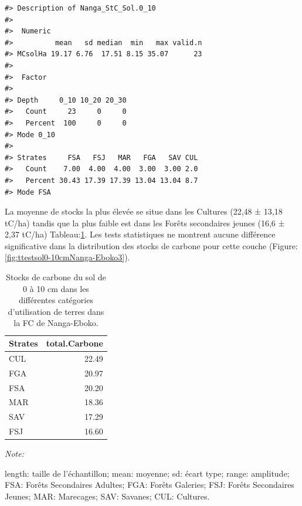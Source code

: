 \documentclass[
  12pt,
  a4paper,
  extrafontsizes,
  onecolumn,
  openright]{book}
\theoremstyle{definition}
\theoremstyle{definition}
\theoremstyle{definition}
\theoremstyle{definition}
\theoremstyle{remark}
\begin{document}
\begin{verbatim}
#> Description of Nanga_StC_Sol.0_10
#> 
#>  Numeric 
#>          mean   sd median  min   max valid.n
#> MCsolHa 19.17 6.76  17.51 8.15 35.07      23
#> 
#>  Factor 
#>          
#> Depth     0_10 10_20 20_30
#>   Count     23     0     0
#>   Percent  100     0     0
#> Mode 0_10 
#>          
#> Strates     FSA   FSJ   MAR   FGA   SAV CUL
#>   Count    7.00  4.00  4.00  3.00  3.00 2.0
#>   Percent 30.43 17.39 17.39 13.04 13.04 8.7
#> Mode FSA
\end{verbatim}

La moyenne de stocks la plus élevée se situe dans les Cultures (22,48 ± 13,18 tC/ha) tandis que la plus faible est dans les Forêts secondaires jeunes (16,6 ± 2,37 tC/ha) Tableau:\ref{tab:Stockscarbonesolde0-10cmNanga-Eboko3}. Les tests statistiques ne montrent aucune différence significative dans la distribution des stocks de carbone pour cette couche (Figure:\ref{fig:ttestsol0-10cmNanga-Eboko3}).

\begin{table}[H]
\centering
\caption{\label{tab:Stockscarbonesolde0-10cmNanga-Eboko3}Stocks de carbone du sol de 0 à 10 cm dans les différentes catégories d'utilisation de terres dans la FC de Nanga-Eboko.}
\centering
\begin{threeparttable}
\begin{tabular}[t]{lr}
\toprule
Strates & total.Carbone\\
\midrule
CUL & 22.49\\
FGA & 20.97\\
FSA & 20.20\\
MAR & 18.36\\
SAV & 17.29\\
\addlinespace
FSJ & 16.60\\
\bottomrule
\end{tabular}
\begin{tablenotes}
\item \textit{Note: } 
\item length: taille de l'échantillon; mean: moyenne; sd: écart type; range: amplitude; FSA: Forêts Secondaires Adultes; FGA: Forêts Galeries; FSJ: Forêts Secondaires Jeunes; MAR: Marecages; SAV: Savanes; CUL: Cultures.
\end{tablenotes}
\end{threeparttable}
\end{table}
\end{document}
